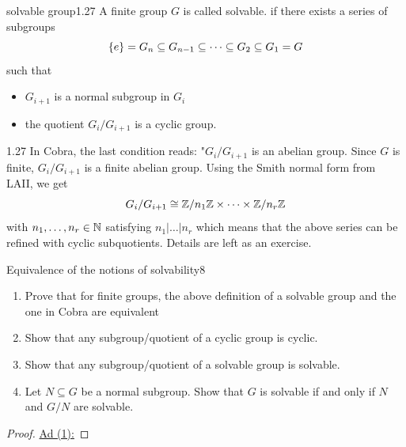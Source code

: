 \documentclass[twoside = false,	%
		headsepline,		%
		parskip = true,
		]{scrbook}						%
\begin{document}
        \begin{definition}{solvable group}{1.27}
            A finite group $G$ is called solvable. if there exists a series of subgroups
            $$\left\{ e\right\} = G_n\subseteq G_{n-1}\subseteq \dots \subseteq G_2\subseteq G_1= G$$
            such that \begin{itemize}
                \item $G_{i+1}$ is a normal subgroup in $G_i$
                \item the quotient $G_i/G_{i+1}$ is a cyclic group.
            \end{itemize}
        \end{definition}
        \begin{remark}{}{1.27}
            In Cobra, the last condition reads: "$G_i/G_{i+1}$ is an abelian group. Since $G$ is finite, $G_i/G_{i+1}$ is a finite abelian group. Using the Smith normal form from LAII, we get
            $$G_i/G_{i+1} \cong \mathbb Z/n_1\mathbb Z \times \dots \times \mathbb Z/n_r\mathbb Z$$ with $n_1,\dots, n_r\in\mathbb N$ satisfying $n_1|\dots|n_r$ which means that the above series can be refined with cyclic subquotients. Details are left as an exercise.
        \end{remark}
        \begin{exercise}{Equivalence of the notions of solvability}{8}
            \begin{enumerate}
                \item Prove that for finite groups, the above definition of a solvable group and the one in Cobra are equivalent
                \item Show that any subgroup/quotient of a cyclic group is cyclic.
                \item Show that any subgroup/quotient of a solvable group is solvable.
                \item Let $N\subseteq G$ be a normal subgroup. Show that $G$ is solvable if and only if $N$ and $G/N$ are solvable.
            \end{enumerate}
        \end{exercise}

         \begin{proof}
             \underline{Ad (1):}
         \end{proof}
        
\end{document}
